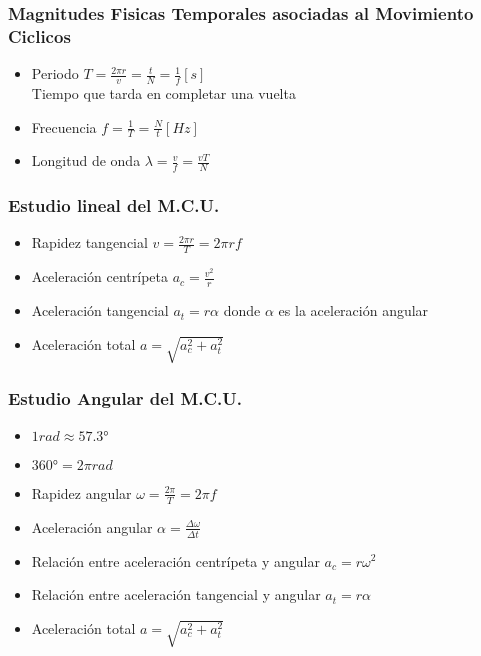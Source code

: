 \documentclass[11pt]{article}
\begin{document}
        \subsubsection{Magnitudes Fisicas Temporales asociadas al Movimiento Ciclicos}
                \begin{itemize}
                    \item Periodo $T = \frac{2\pi r}{v} = \frac{t}{N} = \frac{1}{f} [s]$ \\
                        Tiempo que tarda en completar una vuelta
                    \item Frecuencia $f = \frac{1}{T} = \frac{N}{t} [Hz]$
                    \item Longitud de onda $\lambda = \frac{v}{f} = \frac{vT}{N}$ 
                \end{itemize}

        \subsubsection{Estudio lineal del M.C.U.}
        \begin{itemize}
            \item Rapidez tangencial $v = \frac{2\pi r}{T} = 2\pi rf $
            \item Aceleración centrípeta $a_c = \frac{v^2}{r} $
            \item Aceleración tangencial $a_t = r\alpha$ donde $\alpha$ es la aceleración angular
            \item Aceleración total $a = \sqrt{a_c^2 + a_t^2}$
        \end{itemize}

        \subsubsection{Estudio Angular del M.C.U.}
        \begin{itemize}
            \item $1 rad \approx 57.3° $
            \item $360° = 2\pi rad$
            \item Rapidez angular $\omega = \frac{2\pi}{T} = 2\pi f$
            \item Aceleración angular $\alpha = \frac{\Delta \omega}{\Delta t}$
            \item Relación entre aceleración centrípeta y angular $a_c = r\omega^2$
            \item Relación entre aceleración tangencial y angular $a_t = r\alpha$
            \item Aceleración total $a = \sqrt{a_c^2 + a_t^2} $
        \end{itemize}


            
\end{document}
